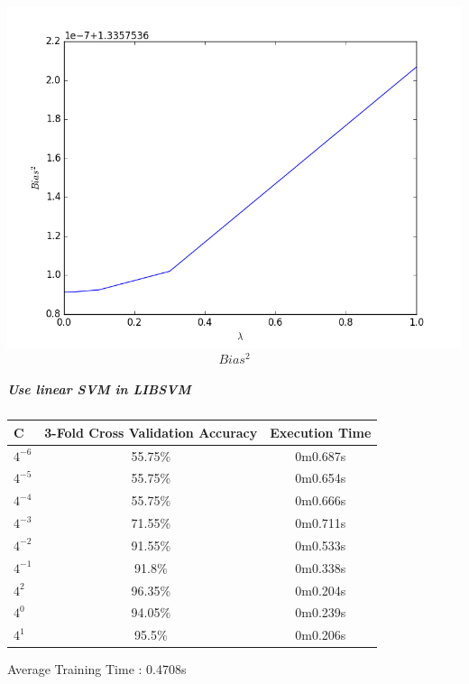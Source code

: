 \documentclass[]{report}
\begin{document}
	\begin{center}
		
		\includegraphics[width=\textwidth]{bias_lambda}
		\[ Bias^2 \]
	\end{center}

\subparagraph{Use linear SVM in LIBSVM}
	\begin{center}
		\begin{tabular}{l|c|c}
			\hline
			    C     & 3-Fold Cross Validation Accuracy  & Execution Time \\
			    \hline
			    $4^{-6}$     & 55.75\%     & 0m0.687s      \\
			    $4^{-5}$     & 55.75\%     & 0m0.654s      \\
			    $4^{-4}$     & 55.75\%     & 0m0.666s      \\
			    $4^{-3}$     & 71.55\%     & 0m0.711s      \\
			    $4^{-2}$     & 91.55\%     & 0m0.533s      \\
			    $4^{-1}$     & 91.8\%      & 0m0.338s      \\
			    $4^{2}$      & 96.35\%     & 0m0.204s      \\
			    $4^{0}$      & 94.05\%     & 0m0.239s      \\
			    $4^{1}$      & 95.5\%      & 0m0.206s      \\
			\hline
		\end{tabular}
	\end{center}
	Average Training Time : 0.4708s

\newpage
\end{document}
